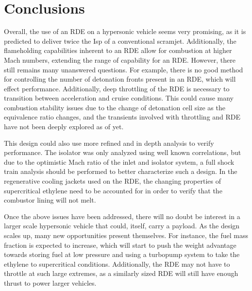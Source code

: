 \section{Conclusions}

Overall, the use of an RDE on a hypersonic vehicle seems very promising, as it is predicted to deliver twice the Isp of a conventional scramjet. Additionally, the flameholding capabilities inherent to an RDE allow for combustion at higher Mach numbers, extending the range of capability for an RDE. However, there still remains many unanswered questions. For example, there is no good method for controlling the number of detonation fronts present in an RDE, which will effect performance. Additionally, deep throttling of the RDE is necessary to transition between acceleration and cruise conditions. This could cause many combustion stability issues due to the change of detonation cell size as the equivalence ratio changes, and the transients involved with throttling and RDE have not been deeply explored as of yet. 

This design could also use more refined and in depth analysis to verify performance. The isolator was only analyzed using well known correlations, but due to the optimistic Mach ratio of the inlet and isolator system, a full shock train analysis should be performed to better characterize such a design. In the regenerative cooling jackets used on the RDE, the changing properties of supercritical ethylene need to be accounted for in order to verify that the combustor lining will not melt. 

Once the above issues have been addressed, there will no doubt be interest in a larger scale hypersonic vehicle that could, itself, carry a payload. As the design scales up, many new opportunities present themselves. For instance, the fuel mass fraction is expected to increase, which will start to push the weight advantage towards storing fuel at low pressure and using a turbopump system to take the ethylene to supercritical conditions. Additionally, the RDE may not have to throttle at such large extremes, as a similarly sized RDE will still have enough thrust to power larger vehicles.